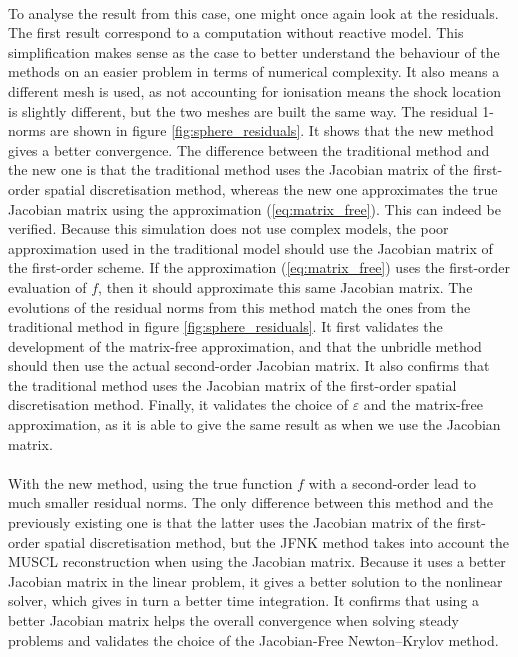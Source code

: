         \paragraph{}
        To analyse the result from this case, one might once again look at the residuals.
        The first result correspond to a computation without reactive model.
        This simplification makes sense as the case to better understand the behaviour of the methods on an easier problem in terms of numerical complexity.
        It also means a different mesh is used, as not accounting for ionisation means the shock location is slightly different, but the two meshes are built the same way.
        The residual 1-norms are shown in figure \ref{fig:sphere_residuals}.
        It shows that the new method gives a better convergence.
        The difference between the traditional method and the new one is that the traditional method uses the Jacobian matrix of the first-order spatial discretisation method, whereas the new one approximates the true Jacobian matrix using the approximation (\ref{eq:matrix_free}).
        This can indeed be verified.
        Because this simulation does not use complex models, the poor approximation used in the traditional model should use the Jacobian matrix of the first-order scheme.
        If the approximation (\ref{eq:matrix_free}) uses the first-order evaluation of $f$, then it should approximate this same Jacobian matrix.
        The evolutions of the residual norms from this method match the ones from the traditional method in figure \ref{fig:sphere_residuals}.
        It first validates the development of the matrix-free approximation, and that the unbridle method should then use the actual second-order Jacobian matrix.
        It also confirms that the traditional method uses the Jacobian matrix of the first-order spatial discretisation method.
        Finally, it validates the choice of $\varepsilon$ and the matrix-free approximation, as it is able to give the same result as when we use the Jacobian matrix.

        \paragraph{}
        With the new method, using the true function $f$ with a second-order lead to much smaller residual norms.
        The only difference between this method and the previously existing one is that the latter uses the Jacobian matrix of the first-order spatial discretisation method, but the JFNK method takes into account the MUSCL reconstruction when using the Jacobian matrix.
        Because it uses a better Jacobian matrix in the linear problem, it gives a better solution to the nonlinear solver, which gives in turn a better time integration.
        It confirms that using a better Jacobian matrix helps the overall convergence when solving steady problems and validates the choice of the Jacobian-Free Newton--Krylov method.

